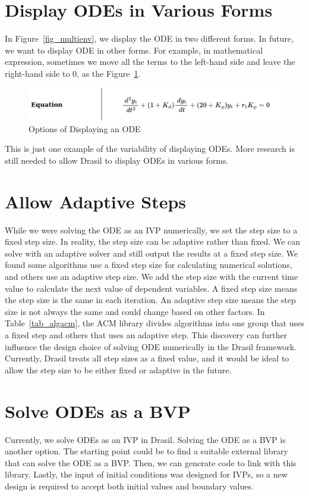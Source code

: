 \section{Display ODEs in Various Forms}
In Figure~\ref{fig_multienv}, we display the ODE in two different forms. In future, we want to display ODE in other forms. For example, in mathematical expression, sometimes we move all the terms to the left-hand side and leave the right-hand side to 0, as the Figure~\ref{fig_odevariousform}.
\begin{figure}[ht]
\centering	
\includegraphics[width=1\textwidth]{figures/ODEVariousForm.png}
\caption{Options of Displaying an ODE}
\label{fig_odevariousform}
\end{figure}
This is just one example of the variability of displaying ODEs. More research is still needed to allow Drasil to display ODEs in various forms.

\section{Allow Adaptive Steps}
While we were solving the ODE as an IVP numerically, we set the step size to a fixed step size. In reality, the step size can be adaptive rather than fixed. We can solve with an adaptive solver and still output the results at a fixed step size. We found some algorithms use a fixed step size for calculating numerical solutions, and others use an adaptive step size. We add the step size with the current time value to calculate the next value of dependent variables. A fixed step size means the step size is the same in each iteration. An adaptive step size means the step size is not always the same and could change based on other factors. In Table~\ref{tab_algacm}, the ACM library divides algorithms into one group that uses a fixed step and others that uses an adaptive step. This discovery can further influence the design choice of solving ODE numerically in the Drasil framework. Currently, Drasil treats all step sizes as a fixed value, and it would be ideal to allow the step size to be either fixed or adaptive in the future.

\section{Solve ODEs as a BVP}
Currently, we solve ODEs as an IVP in Drasil. Solving the ODE as a BVP is another option. The starting point could be to find a suitable external library that can solve the ODE as a BVP. Then, we can generate code to link with this library. Lastly, the input of initial conditions was designed for IVPs, so a new design is required to accept both initial values and boundary values.

